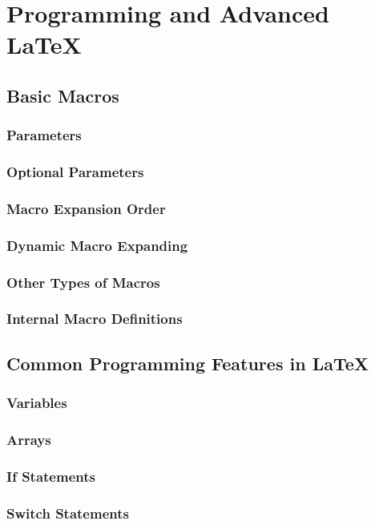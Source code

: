 \section{Programming and Advanced LaTeX}

\subsection{Basic Macros}
\subsubsection{Parameters}
\subsubsection{Optional Parameters}
\subsubsection{Macro Expansion Order}
\subsubsection{Dynamic Macro Expanding}
\subsubsection{Other Types of Macros}
\subsubsection{Internal Macro Definitions}

\subsection{Common Programming Features in LaTeX}
\subsubsection{Variables}
\subsubsection{Arrays}
\subsubsection{If Statements}
\subsubsection{Switch Statements}


